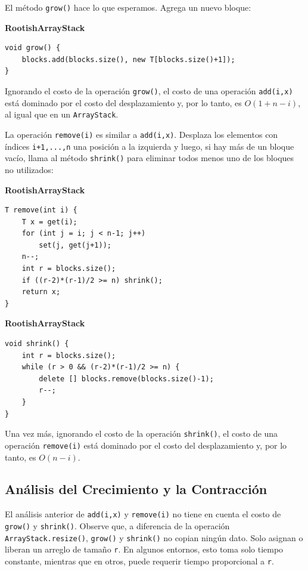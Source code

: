 \documentclass[11pt]{book}
\theoremstyle{plain}
\newcommand{\claseheader}[1]{\noindent\textbf{#1}\par\vspace{-4pt}}
\begin{document}
El método \texttt{grow()} hace lo que esperamos. Agrega un nuevo bloque:

\claseheader{RootishArrayStack}
\begin{lstlisting}
void grow() {
    blocks.add(blocks.size(), new T[blocks.size()+1]);
}
\end{lstlisting}

Ignorando el costo de la operación \texttt{grow()}, el costo de una operación \texttt{add(i,x)} está dominado por el costo del desplazamiento y, por lo tanto, es $O(1+n-i)$, al igual que en un \texttt{ArrayStack}.

La operación \texttt{remove(i)} es similar a \texttt{add(i,x)}. Desplaza los elementos con índices \texttt{i+1,...,n} una posición a la izquierda y luego, si hay más de un bloque vacío, llama al método \texttt{shrink()} para eliminar todos menos uno de los bloques no utilizados:

\claseheader{RootishArrayStack}
\begin{lstlisting}
T remove(int i) {
    T x = get(i);
    for (int j = i; j < n-1; j++)
        set(j, get(j+1));
    n--;
    int r = blocks.size();
    if ((r-2)*(r-1)/2 >= n) shrink();
    return x;
}
\end{lstlisting}

\claseheader{RootishArrayStack}
\begin{lstlisting}
void shrink() {
    int r = blocks.size();
    while (r > 0 && (r-2)*(r-1)/2 >= n) {
        delete [] blocks.remove(blocks.size()-1);
        r--;
    }
}
\end{lstlisting}

Una vez más, ignorando el costo de la operación \texttt{shrink()}, el costo de una operación \texttt{remove(i)} está dominado por el costo del desplazamiento y, por lo tanto, es $O(n - i)$.

\subsection{Análisis del Crecimiento y la Contracción}

El análisis anterior de \texttt{add(i,x)} y \texttt{remove(i)} no tiene en cuenta el costo de \texttt{grow()} y \texttt{shrink()}. Observe que, a diferencia de la operación \texttt{ArrayStack.resize()}, \texttt{grow()} y \texttt{shrink()} no copian ningún dato. Solo asignan o liberan un arreglo de tamaño \texttt{r}. En algunos entornos, esto toma solo tiempo constante, mientras que en otros, puede requerir tiempo proporcional a \texttt{r}.
\end{document}
